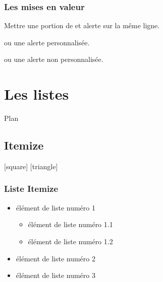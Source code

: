 \documentclass[slidetop,11pt]{beamer}
\begin{document}
\begin{frame}
\frametitle{Les mises en valeur}

Mettre une portion de 
 et  \alert{alerte} sur la même ligne.

\bigskip

ou une \alert{alerte} personnalisée.

ou une \alert{alerte} non personnalisée.
\end{frame}

\section{Les listes}
\begin{frame}{Plan}
  \small {}
\end{frame}

\subsection{Itemize}
[square]
[triangle]
\begin{frame}
\frametitle{Liste Itemize}

\begin{itemize}
    \item élément de liste numéro 1
      \begin{itemize}
      \item élément de liste numéro 1.1
      \item élément de liste numéro 1.2
      \end{itemize}
    \item élément de liste numéro 2
    \item élément de liste numéro 3 
  \end{itemize}
\end{frame}
\end{document}
